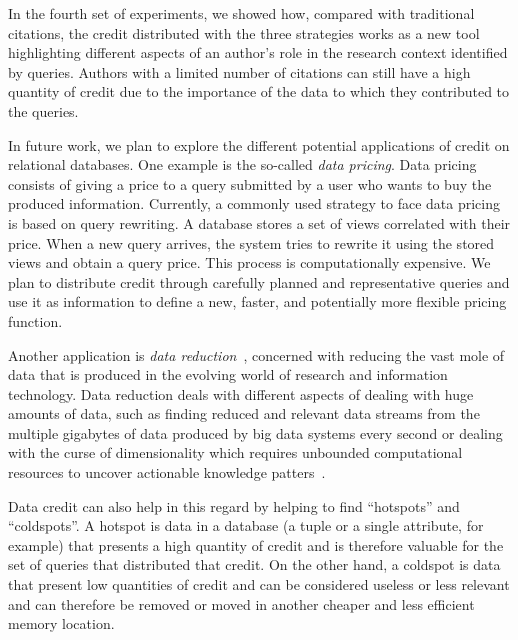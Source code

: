 In the fourth set of experiments, we showed how, compared with traditional citations, the credit distributed with the three strategies works as a new tool highlighting different aspects of an author's role in the research context identified by queries. Authors with a limited number of citations can still have a high quantity of credit due to the importance of the data to which they contributed to the queries. 

In future work, we plan to explore the different potential applications of credit on relational databases.
One example is the so-called \emph{data pricing}. Data pricing consists of giving a price to a query submitted by a user who wants to buy the produced information. Currently, a commonly used strategy to face data pricing is based on query rewriting. A database stores a set of views correlated with their price. When a new query arrives, the system tries to rewrite it using the stored views and obtain a query price. This process is computationally expensive.
We plan to distribute credit through carefully planned and representative queries and use it as information to define a new, faster, and potentially more flexible pricing function.

Another application is \emph{data reduction}~\cite{milo2019getting}, concerned with reducing the vast mole of data that is produced in the evolving world of research and information technology. Data reduction deals with different aspects of dealing with huge amounts of data, such as finding reduced and relevant data streams from the multiple gigabytes of data produced by big data systems every second or dealing with the curse of dimensionality which requires unbounded computational resources to uncover actionable knowledge patters~\citep{ur2016big}.

Data credit can also help in this regard by helping to find ``hotspots'' and ``coldspots''. A hotspot is data in a database (a tuple or a single attribute, for example) that presents a high quantity of credit and is therefore valuable for the set of queries that distributed that credit. 
On the other hand, a coldspot is data that present low quantities of credit and can be considered useless or less relevant and can therefore be removed or moved in another cheaper and less efficient memory location. 
